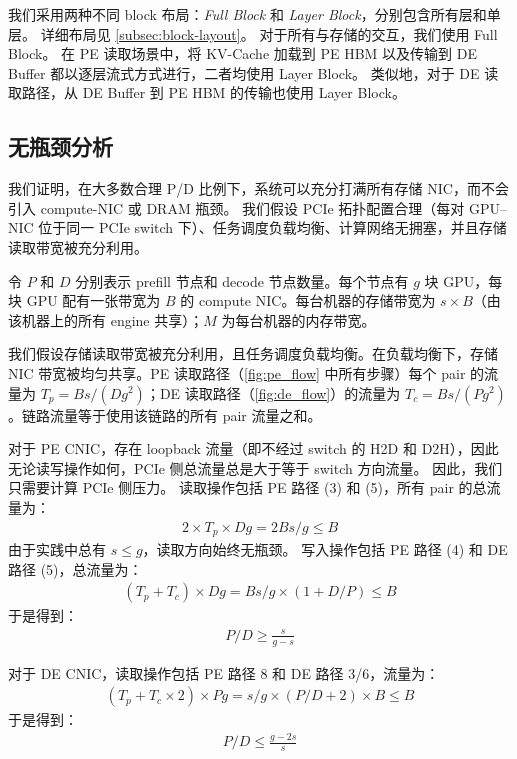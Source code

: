 我们采用两种不同 block 布局：\emph{Full Block} 和 \emph{Layer Block}，分别包含所有层和单层。
详细布局见 \autoref{subsec:block-layout}。
对于所有与存储的交互，我们使用 Full Block。
在 PE 读取场景中，将 KV-Cache 加载到 PE HBM 以及传输到 DE Buffer 都以逐层流式方式进行，二者均使用 Layer Block。
类似地，对于 DE 读取路径，从 DE Buffer 到 PE HBM 的传输也使用 Layer Block。




\subsection{无瓶颈分析}
\label{subsec:bottle-free-analysis}
我们证明，在大多数合理 P/D 比例下，系统可以充分打满所有存储 NIC，而不会引入 compute-NIC 或 DRAM 瓶颈。
我们假设 PCIe 拓扑配置合理（每对 GPU--NIC 位于同一 PCIe switch 下）、任务调度负载均衡、计算网络无拥塞，并且存储读取带宽被充分利用。

 令 $P$ 和 $D$ 分别表示 prefill 节点和 decode 节点数量。每个节点有 $g$ 块 GPU，每块 GPU 配有一张带宽为 $B$ 的 compute NIC。每台机器的存储带宽为 $s \times B$（由该机器上的所有 engine 共享）；$M$ 为每台机器的内存带宽。

 我们假设存储读取带宽被充分利用，且任务调度负载均衡。在负载均衡下，存储 NIC 带宽被均匀共享。PE 读取路径（\autoref{fig:pe_flow} 中所有步骤）每个 pair 的流量为 $T_p = Bs/(Dg^2)$；DE 读取路径（\autoref{fig:de_flow}）的流量为 $T_c = Bs/(Pg^2)$。链路流量等于使用该链路的所有 pair 流量之和。



对于 PE CNIC，存在 loopback 流量（即不经过 switch 的 H2D 和 D2H），因此无论读写操作如何，PCIe 侧总流量总是大于等于 switch 方向流量。
因此，我们只需要计算 PCIe 侧压力。
读取操作包括 PE 路径 (3) 和 (5)，所有 pair 的总流量为：
\begin{align}
2\times T_p \times Dg = 2Bs/g \leq B
\end{align}
由于实践中总有 $s\leq g$，读取方向始终无瓶颈。
写入操作包括 PE 路径 (4) 和 DE 路径 (5)，总流量为：
\begin{align}
(T_p + T_c) \times Dg = Bs/g \times (1 + D/P) \leq B
\end{align}
于是得到：
\begin{align}
P/D \geq \frac{s}{g-s}
\end{align}

对于 DE CNIC，读取操作包括 PE 路径 8 和 DE 路径 3/6，流量为：
\begin{align}
(T_p + T_c \times 2) \times Pg = s/g\times (P/D+2) \times B \leq B
\end{align}
于是得到：
\begin{align}
P/D \leq \frac{g-2s}{s}
\end{align}


